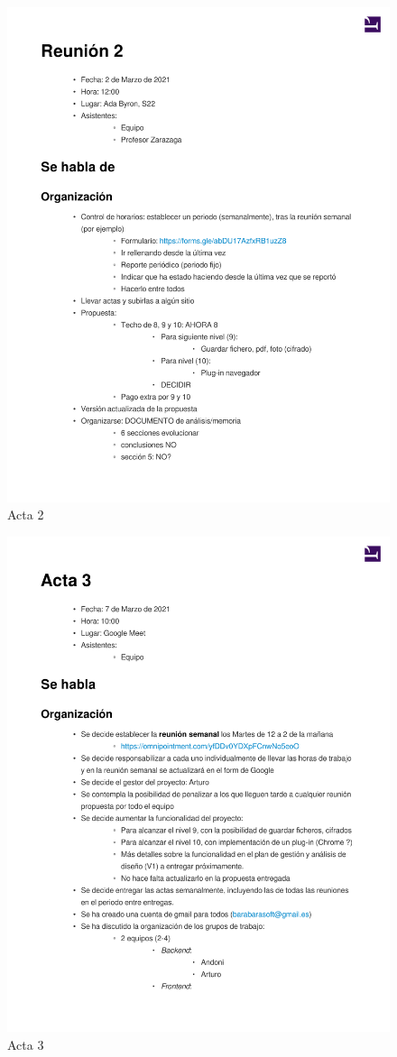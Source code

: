 \documentclass{article}
\begin{document}
\begin{figure}
    \includegraphics[width=.8\textwidth]{../../actas_reuniones/acta2.pdf}
    \caption{Acta 2}
\end{figure}
\begin{figure}
    \includegraphics[width=.8\textwidth]{../../actas_reuniones/acta3.pdf}
    \caption{Acta 3}
\end{figure}
\end{document}
